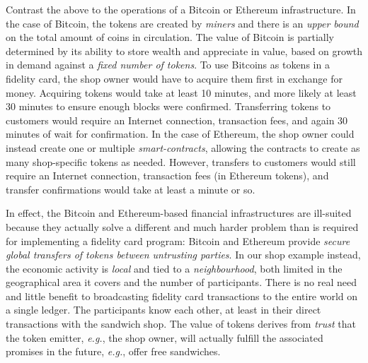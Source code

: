 \documentclass[sigconf,9pt]{acmart}
\begin{document}
Contrast the above to the operations of a Bitcoin or Ethereum infrastructure. In the case of Bitcoin, the tokens are created by \textit{miners} and there is an \textit{upper bound} on the total amount of coins in circulation. 
The value of Bitcoin is partially determined by its ability to store wealth and appreciate in value, based on growth in demand against a \textit{fixed number of tokens}. To use Bitcoins as tokens in a fidelity card, the shop owner would have to acquire them first in exchange for money. Acquiring tokens would take at least 10 minutes, and more likely at least 30 minutes to ensure enough blocks were confirmed. Transferring tokens to customers would require an Internet connection, transaction fees, and again 30 minutes of wait for confirmation. In the case of Ethereum, the shop owner could instead create one or multiple \textit{smart-contracts}, allowing the contracts to create as many shop-specific tokens as needed. However, transfers to customers would still require an Internet connection, transaction fees (in Ethereum tokens), and transfer confirmations would take at least a minute or so. %

In effect, the Bitcoin and Ethereum-based financial infrastructures are ill-suited because they actually solve a different and much harder problem than is required for implementing a fidelity card program: Bitcoin and Ethereum provide \textit{secure global transfers of tokens between untrusting parties}. In our shop example instead, the economic activity is \textit{local} and tied to a \textit{neighbourhood}, both limited in the geographical area it covers and the number of participants. There is no real need and little benefit to broadcasting fidelity card transactions to the entire world on a single ledger. The participants know each other, at least in their direct transactions with the sandwich shop. The value of tokens derives from \textit{trust} that the token emitter, \textit{e.g.}, the shop owner, will actually fulfill the associated promises in the future, \textit{e.g.}, offer free sandwiches. 
\end{document}
